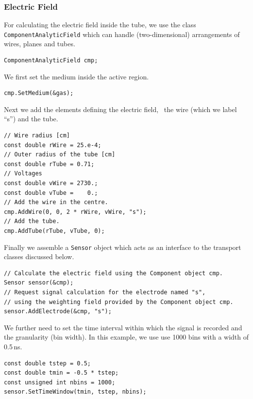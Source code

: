 \subsubsection{Electric Field}
For calculating the electric field inside the tube, 
we use the class \texttt{ComponentAnalyticField} which can handle 
(two-dimensional) arrangements of wires, planes and tubes.
\begin{lstlisting}
ComponentAnalyticField cmp;
\end{lstlisting}
We first set the medium inside the active region. 
\begin{lstlisting}
cmp.SetMedium(&gas); 
\end{lstlisting}
Next we add the elements defining the electric field, 
\ie~the wire (which we label ``s'') and the tube.
\begin{lstlisting}
// Wire radius [cm]
const double rWire = 25.e-4;
// Outer radius of the tube [cm]
const double rTube = 0.71;
// Voltages
const double vWire = 2730.;
const double vTube =    0.;
// Add the wire in the centre.
cmp.AddWire(0, 0, 2 * rWire, vWire, "s");
// Add the tube.
cmp.AddTube(rTube, vTube, 0);
\end{lstlisting}
 
Finally we assemble a \texttt{Sensor} object which acts as an 
interface to the transport classes discussed below.
\begin{lstlisting}
// Calculate the electric field using the Component object cmp.
Sensor sensor(&cmp);
// Request signal calculation for the electrode named "s", 
// using the weighting field provided by the Component object cmp.
sensor.AddElectrode(&cmp, "s"); 
\end{lstlisting}
We further need to set the time interval within which the
signal is recorded and the granularity (bin width). 
In this example, we use use 1000 bins with a width of 0.5\,ns.
\begin{lstlisting}
const double tstep = 0.5;
const double tmin = -0.5 * tstep;
const unsigned int nbins = 1000;
sensor.SetTimeWindow(tmin, tstep, nbins);
\end{lstlisting}

